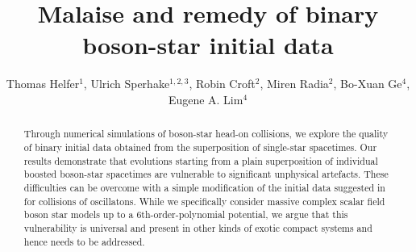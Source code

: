\documentclass[]{iopart}
\begin{document}

\pagestyle{fancy}
\chead{}
\rhead{\thepage}
\lfoot{}
\cfoot{}
\rfoot{}

\begin{center}
\title{\large Malaise and remedy of binary boson-star initial data}
\end{center}

\author{
Thomas Helfer$^{1}$,
Ulrich Sperhake$^{1,2,3}$,
Robin Croft$^{2}$,
Miren Radia$^{2}$,
Bo-Xuan Ge$^4$,
Eugene A. Lim$^4$
}

\address{$^{1}$~Department of Physics and Astronomy, Johns Hopkins University, 3400 N. Charles Street, Baltimore, Maryland 21218, USA}

\address{$^{2}$~Department of Applied Mathematics and Theoretical Physics,
Centre for Mathematical Sciences, University of Cambridge,
Wilberforce Road, Cambridge CB3 0WA, United Kingdom}

\address{$^{3}$~Theoretical Astrophysics 350-17,
California Institute of Technology,
1200 E California Boulevard, Pasadena, CA 91125, USA}

\address{$^{4}$~Theoretical Particle Physics and Cosmology Group, Physics Department,Kings College London, Strand, London WC2R 2LS, United Kingdom}





\begin{abstract}
Through numerical simulations of boson-star head-on collisions, we
explore the quality of binary initial data obtained from the
superposition of single-star spacetimes.  Our results demonstrate
that evolutions starting from a plain superposition of individual
boosted boson-star spacetimes are vulnerable to significant unphysical
artefacts. These difficulties can be overcome with a simple
modification of the initial data suggested in \cite{Helfer:2018vtq}
for collisions of oscillatons.
While we specifically consider massive complex scalar field boson
star models up to a 6th-order-polynomial potential, we argue that
this vulnerability is universal and present in other kinds of exotic
compact systems and hence needs to be addressed.
\end{abstract}

\maketitle
\end{document}
